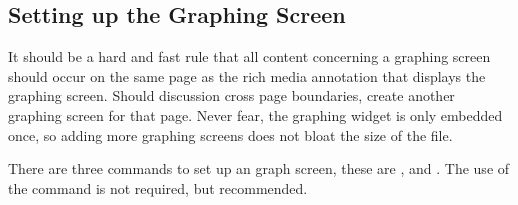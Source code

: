 \documentclass{article}
\begin{document}
\subsection{Setting up the Graphing Screen}

It should be a hard and fast rule that all content concerning a
graphing screen should occur on the same page as the rich media
annotation that displays the graphing screen. Should discussion
cross page boundaries, create another graphing screen for that page.
Never fear, the {\AcroFLeX} graphing widget is only embedded once,
so adding more graphing screens does not bloat the size of the file.

There are three commands to set up an {\AcroFLeX} graph screen, these are
,  and . The use of
the command  is not required, but recommended.

\begin{dCmd}{.8\linewidth}
\end{dCmd}
\end{document}
